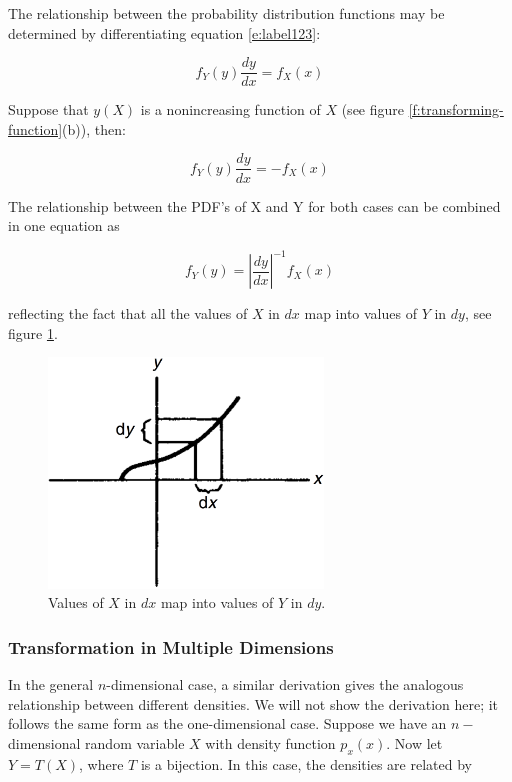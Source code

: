 The relationship between the probability distribution functions may be determined by differentiating equation \ref{e:label123}:

\begin{equation}
	f_Y(y)\frac{dy}{dx}=f_X(x)
\end{equation}


Suppose that $y(X)$ is a nonincreasing function of $X$ (see figure \ref{f:transforming-function}(b)), then:

\begin{equation}
	f_Y(y)\frac{dy}{dx}=-f_X(x)
\end{equation} 

The relationship between the PDF's of X and Y for both cases can be combined in one equation as

\begin{equation}
	f_Y(y)=|\frac{dy}{dx}|^{-1}f_X(x)
\end{equation}

reflecting the fact that all the values of $X$ in $dx$ map into values of $Y$ in $dy$, see figure \ref{f:pdf-map}.

\begin{figure}
\sidecaption
	\includegraphics[width=0.65\textwidth]{graphics/gi/mc-10}
	\caption{Values of $X$ in $dx$ map into values of $Y$ in $dy$.}
	\label{f:pdf-map}
\end{figure}

\subsubsection{Transformation in Multiple Dimensions}
In the general $n$-dimensional case, a similar derivation gives the analogous relationship between different densities. We will not show the derivation here; it follows the same form as the one-dimensional case. Suppose we have an $n-$dimensional random variable $X$ with density function $p_x(x)$. Now let $Y = T (X)$, where $T$ is a bijection. In this case, the densities are related by

